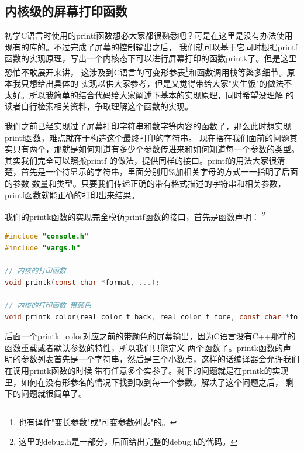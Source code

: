 \subsection {内核级的屏幕打印函数}

\par 初学C语言时使用的printf函数想必大家都很熟悉吧？可是在这里是没有办法使用现有的库的。不过完成了屏幕的控制输出之后，\allowbreak
我们就可以基于它同时根据printf函数的实现原理，写出一个内核态下可以进行屏幕打印的函数printk了。但是这里恐怕不敢展开来讲，\allowbreak
这涉及到C语言的可变形参表\footnote{也有译作"变长参数"或"可变参数列表"的。}和函数调用栈等繁多细节。原本我只想给出具体的\allowbreak
实现以供大家参考，但是又觉得带给大家"夹生饭"的做法不太好。所以我简单的结合代码给大家阐述下基本的实现原理，同时希望没理解\allowbreak
的读者自行检索相关资料，争取理解这个函数的实现。

\par 我们之前已经实现过了屏幕打印字符串和数字等内容的函数了，那么此时想实现printf函数，难点就在于构造这个最终打印的字符串。\allowbreak
现在摆在我们面前的问题其实只有两个，那就是如何知道有多少个参数传进来和如何知道每一个参数的类型。其实我们完全可以照搬printf\allowbreak
的做法，提供同样的接口。printf的用法大家很清楚，首先是一个待显示的字符串，里面分别用\%加相关字母的方式一一指明了后面的参数\allowbreak
数量和类型。只要我们传递正确的带有格式描述的字符串和相关参数，printf函数就能正确的打印出来结果。

\par 我们的printk函数的实现完全模仿printf函数的接口，首先是函数声明：\allowbreak
\footnote{这里的debug.h是一部分，后面给出完整的debug.h的代码。}

\begin{lstlisting}[language = C, caption = include/debug.h]
#include "console.h"
#include "vargs.h"

// 内核的打印函数
void printk(const char *format, ...);

// 内核的打印函数 带颜色
void printk_color(real_color_t back, real_color_t fore, const char *format, ...);
\end{lstlisting}

\par 后面一个printk\_color对应之前的带颜色的屏幕输出，因为C语言没有C++那样的函数重载或者默认参数的特性，所以我们只能定义\allowbreak
两个函数了。printk函数的声明的参数列表首先是一个字符串，然后是三个小数点，这样的话编译器会允许我们在调用printk函数的时候\allowbreak
带有任意多个实参了。剩下的问题就是在printk的实现里，如何在没有形参名的情况下找到取到每一个参数。解决了这个问题之后，\allowbreak
剩下的问题就很简单了。

